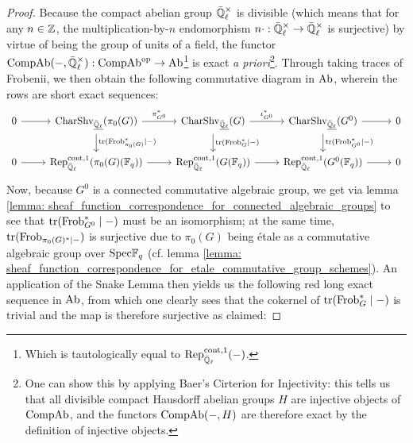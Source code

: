                 \begin{proof}
                    Because the compact abelian group $\bar{\Q}_{\ell}^{\x}$ is divisible (which means that for any $n \in \mathbb{Z}$, the multiplication-by-$n$ endomorphism $n \cdot: \bar{\Q}_{\ell}^{\x} \to \bar{\Q}_{\ell}^{\x}$ is surjective) by virtue of being the group of units of a field, the functor $\Comp\Ab(-, \bar{\Q}_{\ell}^{\x}): \Comp\Ab^{\op} \to \Ab$\footnote{Which is tautologically equal to $\mathrm{Rep}^{\mathrm{cont}, 1}_{\bar{\mathbb{Q}}_{\ell}}(-)$.} is exact \textit{a priori}\footnote{One can show this by applying Baer's Cirterion for Injectivity: this tells us that all divisible compact Hausdorff abelian groups $H$ are injective objects of $\mathrm{Comp}\mathrm{Ab}$, and the functors $\mathrm{Comp}\mathrm{Ab}(-, H)$ are therefore exact by the definition of injective objects.}. Through taking traces of Frobenii, we then obtain the following commutative diagram in $\mathrm{Ab}$, wherein the rows are short exact sequences:
                        $$
                            \begin{tikzcd}
                            	0 & {\Char\Shv_{\underline{\bar{\Q}_{\ell}}}(\pi_0(G))} & {\Char\Shv_{\underline{\bar{\Q}_{\ell}}}(G)} & {\Char\Shv_{\underline{\bar{\Q}_{\ell}}}(G^0)} & 0 \\
                            	0 & {\Rep^{\cont, 1}_{\bar{\Q}_{\ell}}(\pi_0(G)(\F_q))} & {\Rep^{\cont, 1}_{\bar{\Q}_{\ell}}(G(\F_q))} & {\Rep^{\cont, 1}_{\bar{\Q}_{\ell}}(G^0(\F_q))} & 0
                            	\arrow[from=1-1, to=1-2]
                            	\arrow["{\pi_{G^0}^*}", from=1-2, to=1-3]
                            	\arrow["{\iota_{G^0}^*}", from=1-3, to=1-4]
                            	\arrow[from=1-4, to=1-5]
                            	\arrow[from=2-1, to=2-2]
                            	\arrow[from=2-2, to=2-3]
                            	\arrow[from=2-3, to=2-4]
                            	\arrow[from=2-4, to=2-5]
                            	\arrow["{\trace(\Frob_{\pi_0(G)}^* \mid -)}", from=1-2, to=2-2]
                            	\arrow["{\trace(\Frob_G^* \mid -)}", from=1-3, to=2-3]
                            	\arrow["{\trace(\Frob_{G^0}^* \mid -)}", from=1-4, to=2-4]
                            \end{tikzcd}
                        $$
                    Now, because $G^0$ is a connected commutative algebraic group, we get via lemma \ref{lemma: sheaf_function_correspondence_for_connected_algebraic_groups} to see that $\operatorname{tr}(\mathrm{Frob}_{G^0}^* \mid -)$ must be an isomorphism; at the same time, $\operatorname{tr}(\mathrm{Frob}_{\pi_0(G)^* \mid -})$ is surjective due to $\pi_0(G)$ being \'etale as a commutative algebraic group over $\mathrm{Spec} \mathbb{F}_q$ (cf. lemma \ref{lemma: sheaf_function_correspondence_for_etale_commutative_group_schemes}). An application of the Snake Lemma then yields us the following red long exact sequence in $\mathrm{Ab}$, from which one clearly sees that the cokernel of $\operatorname{tr}(\mathrm{Frob}_G^* \mid -)$ is trivial and the map is therefore surjective as claimed:

\end{proof}
